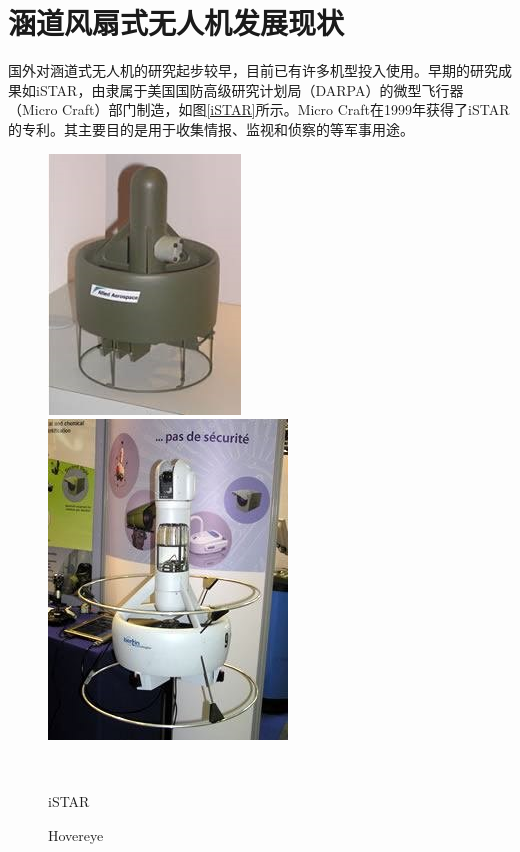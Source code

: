 \section{涵道风扇式无人机发展现状}
国外对涵道式无人机的研究起步较早，目前已有许多机型投入使用。早期的研究成果如iSTAR，由隶属于美国国防高级研究计划局（DARPA）的微型飞行器（Micro Craft）部门制造，如图\ref{iSTAR}所示。Micro Craft在1999年获得了iSTAR的专利。其主要目的是用于收集情报、监视和侦察的等军事用途\cite{Ko_2007,Guerrero_2003,Mullens_2004}。
\begin{figure}[htbp]
	\centering
	\begin{minipage}[c]{0.5\textwidth}
		\centering
		\includegraphics[scale=1]{Fig/iSTAR.jpg}
	\end{minipage}%
	\begin{minipage}[c]{0.5\textwidth}
		\centering
		\includegraphics[scale=0.61]{Fig/Hovereye.png}
	\end{minipage}\\[1pt]
	\begin{minipage}[t]{.5\textwidth}
		\caption{\label{iSTAR}iSTAR}
	\end{minipage}%
	\begin{minipage}[t]{.5\textwidth}
		\caption{\label{Hovereye}Hovereye}
	\end{minipage}%
\end{figure}

